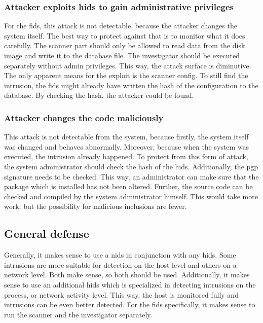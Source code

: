 \subsubsection{Attacker exploits \gls{hids} to gain administrative privileges}
\label{sec:defense:exploitforroot}

For the \gls{fids}, this attack is not detectable, because the attacker changes the system itself. The best way to protect against that is to monitor what it does carefully. The scanner part should only be allowed to read data from the disk image and write it to the database file. The investigator should be executed separately without admin privileges. This way, the attack surface is diminutive. The only apparent means for the exploit is the scanner config. To still find the \gls{intrusion}, the \gls{fids} might already have written the hash of the configuration to the database. By checking the hash, the attacker could be found. 

\subsubsection{Attacker changes the code maliciously}
\label{sec:defense:codechange}

This attack is not detectable from the system, because firstly, the system itself was changed and behaves abnormally. Moreover, because when the system was executed, the \gls{intrusion} already happened. To protect from this form of attack, the system administrator should check the hash of the \gls{hids}. Additionally, the \gls{pgp} signature needs to be checked. This way, an administrator can make sure that the package which is installed has not been altered. Further, the source code can be checked and compiled by the system administrator himself. This would take more work, but the possibility for malicious inclusions are fewer. 

\subsection{General defense}
\label{sec:defense:general}

Generally, it makes sense to use a \gls{nids} in conjunction with any \gls{hids}. Some \glspl{intrusion} are more suitable for detection on the host level and others on a network level. Both make sense, so both should be used. Additionally, it makes sense to use an additional \gls{hids} which is specialized in detecting \glspl{intrusion} on the process, or network activity level. This way, the host is monitored fully and \glspl{intrusion} can be even better detected. For the \gls{fids}  specifically, it makes sense to run the scanner and the investigator separately.
